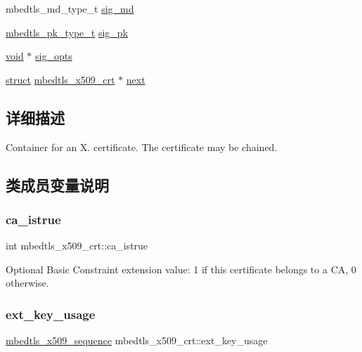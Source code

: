 \begin{DoxyCompactItemize}
\item 
mbedtls\+\_\+md\+\_\+type\+\_\+t \hyperlink{structmbedtls__x509__crt_a5c56937aaf2a51a1d8bc814b142734ca}{sig\+\_\+md}
\item 
\hyperlink{pk_8h_a3fe41eff5605ae727eb9d28dad297020}{mbedtls\+\_\+pk\+\_\+type\+\_\+t} \hyperlink{structmbedtls__x509__crt_a65d5d20352a08c77e173808fde1f8660}{sig\+\_\+pk}
\item 
\hyperlink{interfacevoid}{void} $\ast$ \hyperlink{structmbedtls__x509__crt_a67c497ed6535050997c014507a866e9e}{sig\+\_\+opts}
\item 
\hyperlink{interfacestruct}{struct} \hyperlink{structmbedtls__x509__crt}{mbedtls\+\_\+x509\+\_\+crt} $\ast$ \hyperlink{structmbedtls__x509__crt_ac9dbc43b90ddd74fe55452495a304923}{next}
\end{DoxyCompactItemize}


\subsection{详细描述}
Container for an X. certificate. The certificate may be chained. 

\subsection{类成员变量说明}
\mbox{\label{structmbedtls__x509__crt_a196b3a43dae5a1c0058f46075f832890}} 
\subsubsection{\texorpdfstring{ca\+\_\+istrue}{ca\_istrue}}
{\footnotesize\ttfamily int mbedtls\+\_\+x509\+\_\+crt\+::ca\+\_\+istrue}

Optional Basic Constraint extension value\+: 1 if this certificate belongs to a CA, 0 otherwise. \mbox{\label{structmbedtls__x509__crt_ac94f7360a7143ce1b983fab46c34dcf2}} 
\subsubsection{\texorpdfstring{ext\+\_\+key\+\_\+usage}{ext\_key\_usage}}
{\footnotesize\ttfamily \hyperlink{group__x509__module_gabd52d60a09315854d9ef849d02154f35}{mbedtls\+\_\+x509\+\_\+sequence} mbedtls\+\_\+x509\+\_\+crt\+::ext\+\_\+key\+\_\+usage}


